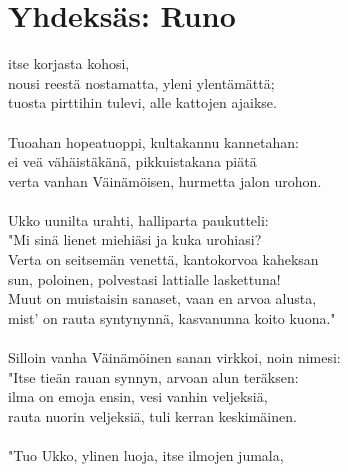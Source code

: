 
\chapter*{Yhdeksäs: Runo}

 itse korjasta kohosi,             \\
nousi reestä nostamatta, yleni ylentämättä;                            \\
tuosta pirttihin tulevi, alle kattojen ajaikse.                        \\
                                                                       \\
Tuoahan hopeatuoppi, kultakannu kannetahan:                            \\
ei veä vähäistäkänä, pikkuistakana piätä                               \\
verta vanhan Väinämöisen, hurmetta jalon urohon.                       \\
                                                                       \\
Ukko uunilta urahti, halliparta paukutteli:                            \\
"Mi sinä lienet miehiäsi ja kuka urohiasi?                             \\
Verta on seitsemän venettä, kantokorvoa kaheksan                       \\
sun, poloinen, polvestasi lattialle laskettuna!                        \\
Muut on muistaisin sanaset, vaan en arvoa alusta,                      \\
mist' on rauta syntynynnä, kasvanunna koito kuona."                    \\
                                                                       \\
Silloin vanha Väinämöinen sanan virkkoi, noin nimesi:                  \\
"Itse tieän rauan synnyn, arvoan alun teräksen:                        \\
ilma on emoja ensin, vesi vanhin veljeksiä,                            \\
rauta nuorin veljeksiä, tuli kerran keskimäinen.                       \\
                                                                       \\
"Tuo Ukko, ylinen luoja, itse ilmojen jumala,                          \\
